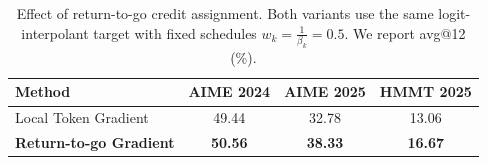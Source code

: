 \begin{table}[t]
\centering
\small
\caption{
Effect of return-to-go credit assignment. Both variants use the same logit-interpolant
target with fixed schedules $w_{k}=\frac{1}{\beta_k}=0.5$. We report avg@12 (\%).
}
\label{tab:lookahead_credit_ablation}
\begin{tabular}{lccc}
\toprule
Method
& AIME 2024
& AIME 2025
& HMMT 2025 \\
\midrule
Local Token Gradient& 49.44
& 32.78
& 13.06 \\
\textbf{Return-to-go Gradient}
& \textbf{50.56}
& \textbf{38.33}
& \textbf{16.67} \\
\bottomrule
\end{tabular}
\end{table}
